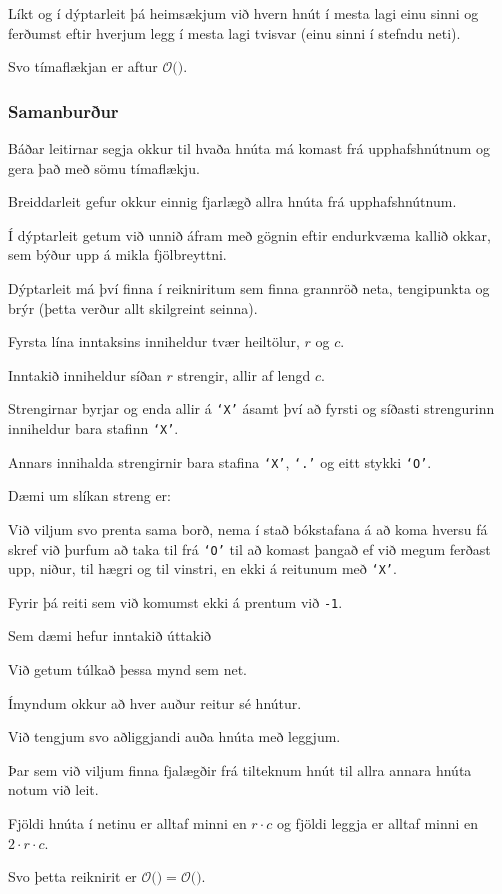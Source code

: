 {
	{
		\item<1-> Líkt og í dýptarleit þá heimsækjum við hvern hnút í mesta lagi einu sinni og
					ferðumst eftir hverjum legg í mesta lagi tvisvar (einu sinni í stefndu neti).
		\item<2-> Svo tímaflækjan er aftur $\mathcal{O}($\onslide<3->{$E + V$}$)$.
	}
}

{
	\frametitle{Samanburður}
	{
		\item<1-> Báðar leitirnar segja okkur til hvaða hnúta má komast frá upphafshnútnum og gera það með sömu tímaflækju.
		\item<2-> Breiddarleit gefur okkur einnig fjarlægð allra hnúta frá upphafshnútnum.
		\item<3-> Í dýptarleit getum við unnið áfram með gögnin eftir endurkvæma kallið okkar, sem býður upp á mikla fjölbreyttni.
		\item<4-> Dýptarleit má því finna í reikniritum sem finna grannröð neta, tengipunkta og brýr (þetta verður allt skilgreint seinna).
	}
}

{
	{
		\item<1-> Fyrsta lína inntaksins inniheldur tvær heiltölur, $r$ og $c$.
		\item<2-> Inntakið inniheldur síðan $r$ strengir, allir af lengd $c$.
		\item<3-> Strengirnar byrjar og enda allir á \texttt{`X'} ásamt því að fyrsti og síðasti strengurinn inniheldur bara stafinn \texttt{`X'}.
		\item<4-> Annars innihalda strengirnir bara stafina \texttt{`X'}, \texttt{`.'} og eitt stykki \texttt{`O'}.
		\item<5-> Dæmi um slíkan streng er:
		\item<6-> Við viljum svo prenta sama borð, nema í stað bókstafana á að koma hversu fá skref við þurfum að taka til frá \texttt{`O'}
					til að komast þangað ef við megum ferðast upp, niður, til hægri og til vinstri, en ekki á reitunum með \texttt{`X'}.
		\item<7-> Fyrir þá reiti sem við komumst ekki á prentum við \texttt{-1}.
	}
}

{
	{
		\item<1-> Sem dæmi hefur inntakið
					úttakið	
	}
}

{
	{
		\item<1-> Við getum túlkað þessa mynd sem net.
		\item<2-> Ímyndum okkur að hver auður reitur sé hnútur.
		\item<3-> Við tengjum svo aðliggjandi auða hnúta með leggjum.
		\item<4-> Þar sem við viljum finna fjalægðir frá tilteknum hnút til allra annara hnúta notum við leit.
		\item<6-> Fjöldi hnúta í netinu er alltaf minni en $r \cdot c$ og fjöldi leggja er alltaf minni en $2 \cdot r \cdot c$.
		\item<7-> Svo þetta reiknirit er $\mathcal{O}($$) = \mathcal{O}($\onslide<9->{$r \cdot c$}$)$.
	}
}

